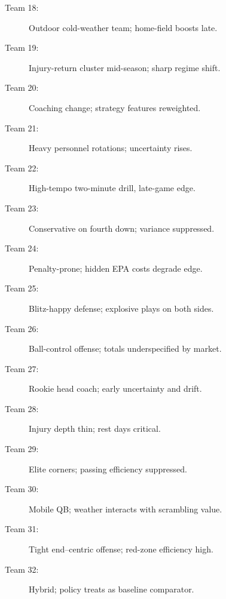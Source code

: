 \documentclass[12pt]{report}  %
\numberwithin{equation}{section}
\theoremstyle{plain}
\theoremstyle{definition}
\theoremstyle{remark}
\begin{document}
\begin{description}
  \item[Team 18:] Outdoor cold-weather team; home-field boosts late.
  \item[Team 19:] Injury-return cluster mid-season; sharp regime shift.
  \item[Team 20:] Coaching change; strategy features reweighted.
  \item[Team 21:] Heavy personnel rotations; uncertainty rises.
  \item[Team 22:] High-tempo two-minute drill, late-game edge.
  \item[Team 23:] Conservative on fourth down; variance suppressed.
  \item[Team 24:] Penalty-prone; hidden EPA costs degrade edge.
  \item[Team 25:] Blitz-happy defense; explosive plays on both sides.
  \item[Team 26:] Ball-control offense; totals underspecified by market.
  \item[Team 27:] Rookie head coach; early uncertainty and drift.
  \item[Team 28:] Injury depth thin; rest days critical.
  \item[Team 29:] Elite corners; passing efficiency suppressed.
  \item[Team 30:] Mobile QB; weather interacts with scrambling value.
  \item[Team 31:] Tight end–centric offense; red-zone efficiency high.
  \item[Team 32:] Hybrid; policy treats as baseline comparator.
\end{description}
\end{document}
